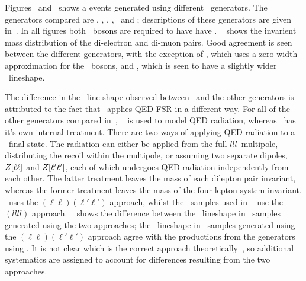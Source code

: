 
Figures~ and~ shows a 
events generated using different \mc\ generators. The generators compared are
\sherpa, \mcatnlo, \powhegbox, \herwig, \herwigPP\ and \pythia; descriptions of
these generators are given in~. In all figures both \Z\
bosons are required to have have \sstooos. 
~ shows the invarient mass distribution of the di-electron and
di-muon pairs. Good agreement is seen between the different generators, with
the exception of \mcatnlo, which uses a zero-width approximation for the \Z\
bosons, and \sherpa, which is seen to have a slightly wider \Z\ lineshape.

The difference in the \Z\ line-shape observed between \sherpa\ and the other
generators is attributed to the fact that \sherpa\ applies QED FSR in a
different way. For all of the other generators compared in~\fig{gen-comp-mZ}, 
\photos~\cite{Golonka:2005pn} is used
to model QED radiation, whereas \sherpa\ has it's own internal treatment. There are two
ways of applying QED radiation to a \ZZllll\ final state. The radiation can
either be applied from the full $lll$\ multipole, distributing the recoil within
the multipole, or assuming two separate dipoles, $Z[\ell\ell]$ and
$Z[\ell'\ell']$, each
of which undergoes QED radiation independently from each other. The latter
treatment leaves the mass of each dilepton pair invariant, whereas the former
treatment leaves the mass of the four-lepton system invariant. \photos\ uses the
$(\ell\ell)(\ell'\ell')$ approach, whilst the \sherpa\ samples used in
~\fig{gen-comp-mZ}
use the $(llll)$ approach. ~\fig{gen-comp-SherpaQED} shows the difference 
between the \Z\
lineshape in \sherpa\ samples generated using the two approaches; the \Z\
lineshape in \sherpa\ samples generated using the $(\ell\ell)(\ell'\ell')$ approach agree with the productions from the generators using \photos. It is not  clear which is the correct approach
theoretically~\cite{Siegert}, so additional systematics are assigned to account
for differences resulting from the two approaches.

